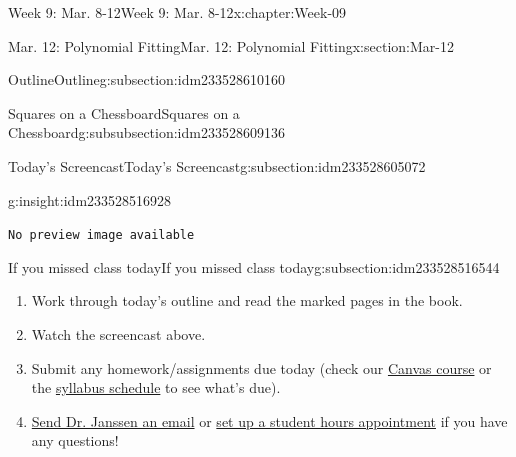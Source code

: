 \documentclass[oneside,10pt,]{book}
\newcommand{\mono}[1]{\texttt{#1}}
\numberwithin{equation}{section}
\newlength{\qrsize}
\newlength{\previewwidth}
\begin{document}
\begin{chapterptx}{Week 9: Mar. 8-12}{}{Week 9: Mar. 8-12}{}{}{x:chapter:Week-09}
\begin{sectionptx}{Mar. 12: Polynomial Fitting}{}{Mar. 12: Polynomial Fitting}{}{}{x:section:Mar-12}
\begin{subsectionptx}{Outline}{}{Outline}{}{}{g:subsection:idm233528610160}
\begin{subsubsectionptx}{Squares on a Chessboard}{}{Squares on a Chessboard}{}{}{g:subsubsection:idm233528609136}
\end{subsubsectionptx}
\end{subsectionptx}
%
%
\typeout{************************************************}
\typeout{************************************************}
%
\begin{subsectionptx}{Today's Screencast}{}{Today's Screencast}{}{}{g:subsection:idm233528605072}
\begin{insight}{}{g:insight:idm233528516928}%
\setlength{\qrsize}{9em}
\setlength{\previewwidth}{\linewidth}
\addtolength{\previewwidth}{-\qrsize}
\begin{tcbraster}[raster columns=2, raster column skip=1pt, raster halign=center, raster force size=false, raster left skip=0pt, raster right skip=0pt]%
\begin{tcolorbox}[previewstyle, width=\previewwidth]%
\mono{No preview image available}%
\end{tcolorbox}%
\begin{tcolorbox}[qrstyle]%
[QR LINK]\end{tcolorbox}%
\end{tcbraster}%
\end{insight}
\end{subsectionptx}
%
%
\typeout{************************************************}
\typeout{************************************************}
%
\begin{subsectionptx}{If you missed class today}{}{If you missed class today}{}{}{g:subsection:idm233528516544}
%
\begin{enumerate}
\item{}Work through today's outline and read the marked pages in the book.%
\item{}Watch the screencast above.%
\item{}Submit any homework\slash{}assignments due today (check our \href{https://dordt.instructure.com/courses/3110050}{Canvas course} or the \href{https://prof.mkjanssen.org/ds/index.html\#schedule}{syllabus schedule} to see what's due).%
\item{}\href{mailto:mike.janssen@dordt.edu}{Send Dr. Janssen an email} or \href{https://calendly.com/mkjanssen/student-hours}{set up a student hours appointment} if you have any questions!%
\end{enumerate}
\end{subsectionptx}
\end{sectionptx}
\end{chapterptx}
\end{document}
